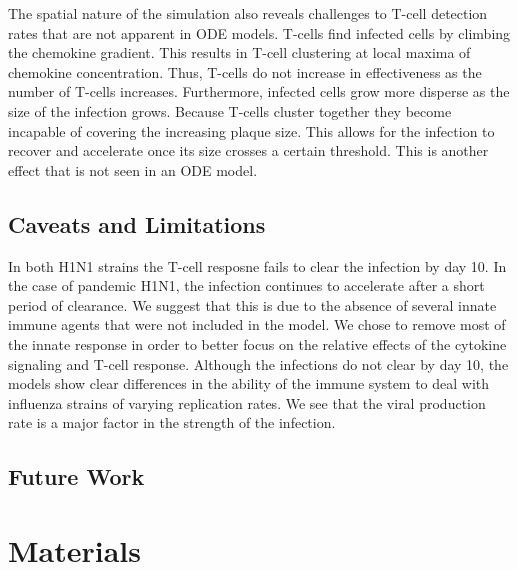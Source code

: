 \documentclass[10pt]{article}
\begin{document}
The spatial nature of the simulation also reveals challenges to T-cell detection rates that are not apparent in ODE models.  T-cells find infected cells by climbing the chemokine gradient.  This results in T-cell clustering at local maxima of chemokine concentration.  Thus, T-cells do not increase in effectiveness as the number of T-cells increases.  Furthermore, infected cells grow more disperse as the size of the infection grows.  Because T-cells cluster together they become incapable of covering the increasing plaque size.  This allows for the infection to recover and accelerate once its size crosses a certain threshold.  This is another effect that is not seen in an ODE model.


\subsection*{Caveats and Limitations}

In both H1N1 strains the T-cell resposne fails to clear the infection by day 10.  In the case of pandemic H1N1, the infection continues to accelerate after a short period of clearance.  We suggest that this is due to the absence of several innate immune agents that were not included in the model.  We chose to remove most of the innate response in order to better focus on the relative effects of the cytokine signaling and T-cell response.  Although the infections do not clear by day 10, the models show clear differences in the ability of the immune system to deal with influenza strains of varying replication rates.  We see that the viral production rate is a major factor in the strength of the infection.

\subsection*{Future Work}



\section*{Materials}
\end{document}
